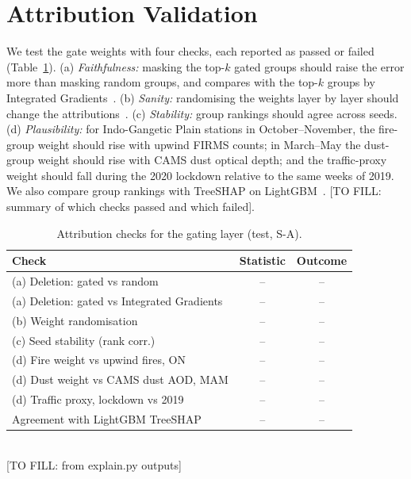 \documentclass[conference]{IEEEtran}
\newcommand{\blank}[1]{{\color{red!75!black}\sffamily\footnotesize[TO FILL: #1]}}
\newcommand{\nd}{--}
\begin{document}
\section{Attribution Validation}
We test the gate weights with four checks, each reported as passed or failed (Table~\ref{tab:xai}).
(a) \emph{Faithfulness:} masking the top-$k$ gated groups should raise the error more than masking random groups, and
compares with the top-$k$ groups by Integrated Gradients~\cite{sundararajan2017axiomatic}.
(b) \emph{Sanity:} randomising the weights layer by layer should change the attributions~\cite{adebayo2018sanity}.
(c) \emph{Stability:} group rankings should agree across seeds.
(d) \emph{Plausibility:} for Indo-Gangetic Plain stations in October--November, the fire-group weight should rise with
upwind FIRMS counts; in March--May the dust-group weight should rise with CAMS dust optical depth; and the traffic-proxy
weight should fall during the 2020 lockdown relative to the same weeks of 2019.
We also compare group rankings with TreeSHAP on LightGBM~\cite{lundberg2017a}.
\blank{summary of which checks passed and which failed}.

\begin{table}[t]
\centering
\caption{Attribution checks for the gating layer (test, S-A).}
\label{tab:xai}
\begin{tabular}{lcc}
\toprule
Check & Statistic & Outcome \\
\midrule
(a) Deletion: gated vs random & \nd & \nd \\
(a) Deletion: gated vs Integrated Gradients & \nd & \nd \\
(b) Weight randomisation & \nd & \nd \\
(c) Seed stability (rank corr.) & \nd & \nd \\
(d) Fire weight vs upwind fires, ON & \nd & \nd \\
(d) Dust weight vs CAMS dust AOD, MAM & \nd & \nd \\
(d) Traffic proxy, lockdown vs 2019 & \nd & \nd \\
Agreement with LightGBM TreeSHAP & \nd & \nd \\
\bottomrule
\end{tabular}\\[2pt]
\blank{from explain.py outputs}
\end{table}

\end{document}
